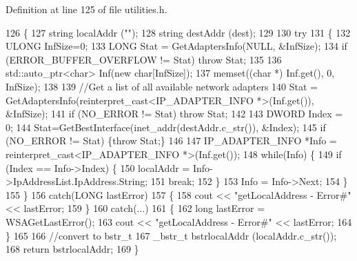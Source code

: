 Definition at line 125 of file utilities.\+h.


\begin{DoxyCode}
126     \{
127         \textcolor{keywordtype}{string} localAddr (\textcolor{stringliteral}{""});
128         \textcolor{keywordtype}{string} destAddr (dest);
129         
130         \textcolor{keywordflow}{try} 
131         \{
132             ULONG InfSize=0;
133             LONG Stat = GetAdaptersInfo(NULL, &InfSize);
134             \textcolor{keywordflow}{if} (ERROR\_BUFFER\_OVERFLOW != Stat) \textcolor{keywordflow}{throw} Stat;      
135 
136             std::auto\_ptr<char> Inf(\textcolor{keyword}{new} \textcolor{keywordtype}{char}[InfSize]);
137             memset((\textcolor{keywordtype}{char} *) Inf.get(), 0, InfSize);
138 
139             \textcolor{comment}{//Get a list of all available network adapters}
140             Stat = GetAdaptersInfo(reinterpret\_cast<IP\_ADAPTER\_INFO *>(Inf.get()), &InfSize);
141             \textcolor{keywordflow}{if} (NO\_ERROR != Stat) \textcolor{keywordflow}{throw} Stat;
142             
143             DWORD Index = 0;
144             Stat=GetBestInterface(inet\_addr(destAddr.c\_str()), &Index);
145             \textcolor{keywordflow}{if} (NO\_ERROR != Stat) \{\textcolor{keywordflow}{throw} Stat;\}
146 
147             IP\_ADAPTER\_INFO *Info = \textcolor{keyword}{reinterpret\_cast<}IP\_ADAPTER\_INFO *\textcolor{keyword}{>}(Inf.get());
148             \textcolor{keywordflow}{while}(Info) \{               
149                 \textcolor{keywordflow}{if} (Index == Info->Index) \{
150                     localAddr = Info->IpAddressList.IpAddress.String;
151                     \textcolor{keywordflow}{break};
152                 \}                   
153                 Info = Info->Next;
154             \}
155         \}
156         \textcolor{keywordflow}{catch}(LONG lastError)
157         \{       
158             cout << \textcolor{stringliteral}{"getLocalAddress - Error#"} << lastError;
159         \}
160         \textcolor{keywordflow}{catch}(...)
161         \{
162             \textcolor{keywordtype}{long} lastError = WSAGetLastError();
163             cout << \textcolor{stringliteral}{"getLocalAddress - Error#"} << lastError;
164         \}
165 
166         \textcolor{comment}{//convert to bstr\_t}
167         \_bstr\_t bstrlocalAddr (localAddr.c\_str());
168         \textcolor{keywordflow}{return} bstrlocalAddr;
169     \}
\end{DoxyCode}
\mbox{\label{class_utilities_aa928f0fb9ad8737b44c5878a37b39be6_aa928f0fb9ad8737b44c5878a37b39be6}} 
